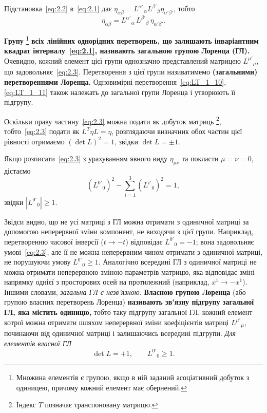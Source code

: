 Підстановка~\eqref{eq:2.2} в~\eqref{eq:2.1} дає
$\eta_{\alpha\beta} = L^{\alpha'}{}_\alpha L^{\beta'}{}_\beta \eta_{\alpha'\beta'}$,
тобто
\begin{equation}
  \eta_{\alpha\beta} = L^{\alpha'}{}_\alpha\, L^{\beta'}{}_\beta\, \eta_{\alpha'\beta'}.
  \label{eq:2.3}
\end{equation}

\textbf{Групу}%
\footnote{Множина елементів є групою, якщо в ній заданий асоціативний
добуток з одиницею, причому кожний елемент має обернений.}
\textbf{всіх лінійних однорідних перетворень, що залишають інваріантним
квадрат інтервалу~\eqref{eq:2.1}, називають загальною групою Лоренца (ГЛ).}
Очевидно, кожний елемент цієї групи однозначно представлений матрицею
$L^{\mu'}{}_\mu$, що задовольняє~\eqref{eq:2.3}.
Перетворення з цієї групи називатимемо \textbf{(загальними) перетвореннями
Лоренца.} Одновимірні перетворення~\eqref{eq:LT_1_10}, \eqref{eq:LT_1_11} також належать до
загальної групи Лоренца і утворюють її підгрупу.

Оскільки праву частину~\eqref{eq:2.3} можна подати як добуток матриць%
\footnote{Індекс $T$ позначає транспоновану матрицю.},
тобто~\eqref{eq:2.3} подати як $L^T \eta L = \eta$,
розглядаючи визначник обох частин цієї рівності отримаємо
$(\det L)^2 = 1$, звідки $\det L = \pm 1$.

Якщо розписати~\eqref{eq:2.3} з урахуванням явного виду $\eta_{\mu\nu}$ та
покласти $\mu = \nu = 0$, дістаємо
\[
  (L^{0'}{}_0)^2 - \sum_{i=1}^{3}(L^{i'}{}_0)^2 = 1,
\]
звідки $|L^{0'}{}_0| \geq 1$.

Звідси видно, що не усі матриці з ГЛ можна отримати з одиничної матриці
за допомогою неперервної зміни компонент, не виходячи з цієї групи.
Наприклад, перетворенню часової інверсії ($t \to -t$) відповідає
$L^{0'}{}_0 = -1$; вона задовольняє умові~\eqref{eq:2.3}, але
її не можна неперервним чином отримати з одиничної матриці, не порушуючи
умову $L^{0'}{}_0 \geq 1$. Аналогічно всередині ГЛ з одиничної матриці
не можна отримати неперервною зміною параметрів матрицю, яка відповідає
зміні напрямку однієї з просторових осей на протилежний (наприклад,
$x^1 \to -x^1$). Іншими словами, \textit{загальна ГЛ є незв'язною.}
\textbf{Власною групою Лоренца} (або групою власних перетворень Лоренца)
\textbf{називають зв'язну підгрупу загальної ГЛ, яка містить одиницю,}
тобто таку підгрупу загальної ГЛ, кожний елемент котрої можна отримати
шляхом неперервної зміни коефіцієнтів матриці $L^{\mu'}{}_\mu$,
починаючи від одиничної матриці і залишаючись всередині підгрупи.
\textit{Для елементів власної ГЛ}
\[
  \det L = +1, \qquad L^{0'}{}_0 \geqslant 1.
\]

